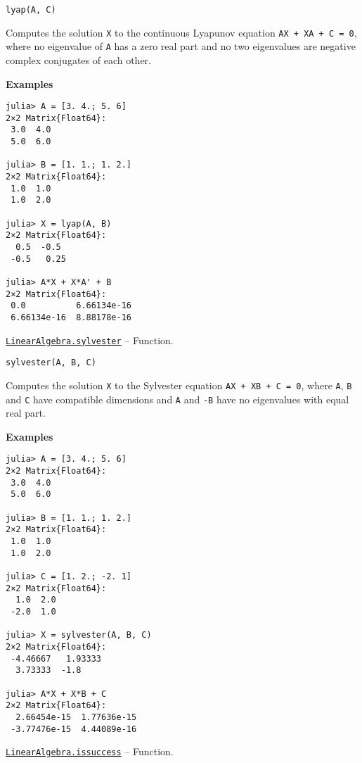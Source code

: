 \begin{adjustwidth}{2em}{0pt}


\begin{verbatim}
lyap(A, C)
\end{verbatim}

Computes the solution \texttt{X} to the continuous Lyapunov equation \texttt{AX + XA{\textquotesingle} + C = 0}, where no eigenvalue of \texttt{A} has a zero real part and no two eigenvalues are negative complex conjugates of each other.

\textbf{Examples}


\begin{verbatim}
julia> A = [3. 4.; 5. 6]
2×2 Matrix{Float64}:
 3.0  4.0
 5.0  6.0

julia> B = [1. 1.; 1. 2.]
2×2 Matrix{Float64}:
 1.0  1.0
 1.0  2.0

julia> X = lyap(A, B)
2×2 Matrix{Float64}:
  0.5  -0.5
 -0.5   0.25

julia> A*X + X*A' + B
2×2 Matrix{Float64}:
 0.0          6.66134e-16
 6.66134e-16  8.88178e-16
\end{verbatim}



\end{adjustwidth}
\hypertarget{1947738214979807634}{}
\hyperlink{1947738214979807634}{\texttt{LinearAlgebra.sylvester}}  -- {Function.}

\begin{adjustwidth}{2em}{0pt}


\begin{verbatim}
sylvester(A, B, C)
\end{verbatim}

Computes the solution \texttt{X} to the Sylvester equation \texttt{AX + XB + C = 0}, where \texttt{A}, \texttt{B} and \texttt{C} have compatible dimensions and \texttt{A} and \texttt{-B} have no eigenvalues with equal real part.

\textbf{Examples}


\begin{verbatim}
julia> A = [3. 4.; 5. 6]
2×2 Matrix{Float64}:
 3.0  4.0
 5.0  6.0

julia> B = [1. 1.; 1. 2.]
2×2 Matrix{Float64}:
 1.0  1.0
 1.0  2.0

julia> C = [1. 2.; -2. 1]
2×2 Matrix{Float64}:
  1.0  2.0
 -2.0  1.0

julia> X = sylvester(A, B, C)
2×2 Matrix{Float64}:
 -4.46667   1.93333
  3.73333  -1.8

julia> A*X + X*B + C
2×2 Matrix{Float64}:
  2.66454e-15  1.77636e-15
 -3.77476e-15  4.44089e-16
\end{verbatim}



\end{adjustwidth}
\hypertarget{10694198281534172656}{}
\hyperlink{10694198281534172656}{\texttt{LinearAlgebra.issuccess}}  -- {Function.}

